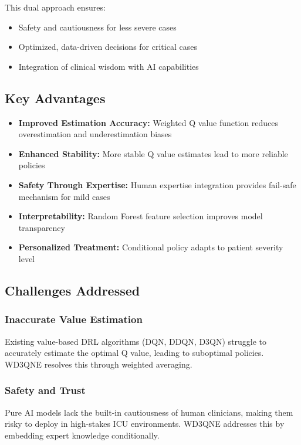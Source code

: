 This dual approach ensures:
\begin{itemize}
    \item Safety and cautiousness for less severe cases
    \item Optimized, data-driven decisions for critical cases
    \item Integration of clinical wisdom with AI capabilities
\end{itemize}

\subsection*{Key Advantages}
\begin{itemize}
    \item \textbf{Improved Estimation Accuracy:} Weighted Q value function reduces overestimation and underestimation biases
    \item \textbf{Enhanced Stability:} More stable Q value estimates lead to more reliable policies
    \item \textbf{Safety Through Expertise:} Human expertise integration provides fail-safe mechanism for mild cases
    \item \textbf{Interpretability:} Random Forest feature selection improves model transparency
    \item \textbf{Personalized Treatment:} Conditional policy adapts to patient severity level
\end{itemize}

\subsection*{Challenges Addressed}

\subsubsection*{Inaccurate Value Estimation}
Existing value-based DRL algorithms (DQN, DDQN, D3QN) struggle to accurately estimate the optimal Q value, leading to suboptimal policies. WD3QNE resolves this through weighted averaging.

\subsubsection*{Safety and Trust}
Pure AI models lack the built-in cautiousness of human clinicians, making them risky to deploy in high-stakes ICU environments. WD3QNE addresses this by embedding expert knowledge conditionally.

